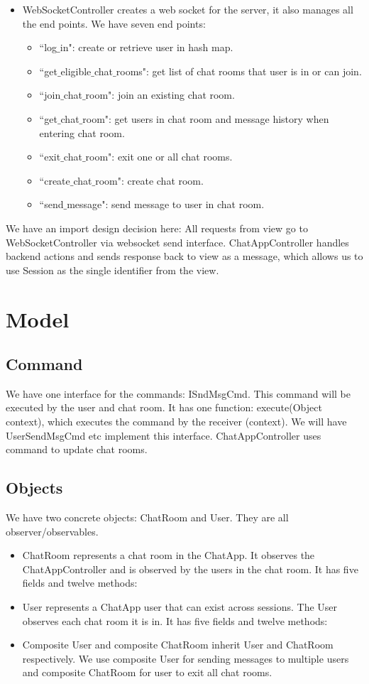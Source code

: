 \documentclass[letterpaper, 11pt]{article}
\begin{document}
\begin{itemize}
\item WebSocketController creates a web socket for the server, it also manages all the end points. We have seven end points:
\begin{itemize}
\item ``log$\_$in": create or retrieve user in hash map.
\item ``get$\_$eligible$\_$chat$\_$rooms": get list of chat rooms that user is in or can join.
\item ``join$\_$chat$\_$room": join an existing chat room.
\item ``get$\_$chat$\_$room": get users in chat room and message history when entering chat room.
\item ``exit$\_$chat$\_$room": exit one or all chat rooms.
\item ``create$\_$chat$\_$room": create chat room.
\item ``send$\_$message": send message to user in chat room.
\end{itemize}
\end{itemize}

We have an import design decision here: All requests from view go to WebSocketController via websocket send interface. ChatAppController handles backend actions and sends response back to view as a message, which allows us to use Session as the single identifier from the view. 

\section{Model}
\subsection{Command}
We have one interface for the commands: ISndMsgCmd. This command will be executed by the user and chat room. It has one function: execute(Object context), which 
executes the command by the receiver (context). We will have UserSendMsgCmd etc implement this interface. ChatAppController uses command to update chat rooms. 

\subsection{Objects}
We have two concrete objects: ChatRoom and User. They are all observer/observables. 
\begin{itemize}
\item ChatRoom represents a chat room in the ChatApp. It observes the ChatAppController and is observed by the users in the chat room. It has five fields and twelve methods:

\item User represents a ChatApp user that can exist across sessions. The User observes each chat room it is in. It has five fields and twelve methods:

\item Composite User and composite ChatRoom inherit User and ChatRoom respectively. We use composite User for sending messages to multiple users and composite ChatRoom for user to exit all chat rooms. 

\end{itemize}
\end{document}
